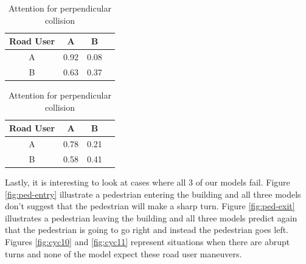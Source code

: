 \documentclass{article}
\begin{document}
\begin{table}[H]
\parbox{.45\linewidth}{
\centering
\begin{tabular}{@{}cccc@{}}
\toprule
Road User & A  & B  \\ \midrule
A  & 0.92 & 0.08 \\ 
B  & 0.63 & 0.37 \\ \midrule
\end{tabular}
\caption{Attention for the acute collision}
\label{table:attn-acute}
}
\hfill
\parbox{.5\linewidth}{
\centering
\begin{tabular}{@{}cccc@{}}
\toprule
Road User & A  & B  \\ \midrule
A  & 0.78 & 0.21 \\ 
B  & 0.58 & 0.41 \\ \midrule
\end{tabular}
\caption{Attention for perpendicular collision}
\label{table:attn-perp}
}
\end{table}









Lastly, it is interesting to look at cases where all 3 of our models fail. Figure \ref{fig:ped-entry} illustrate a pedestrian entering the building and all three models don't suggest that the pedestrian will make a sharp turn. Figure \ref{fig:ped-exit} illustrates a pedestrian leaving the building and all three models predict again that the pedestrian is going to go right and instead the pedestrian goes left. Figures \ref{fig:cyc10} and \ref{fig:cyc11} represent situations when there are abrupt turns and none of the model expect these road user maneuvers. 
\end{document}
